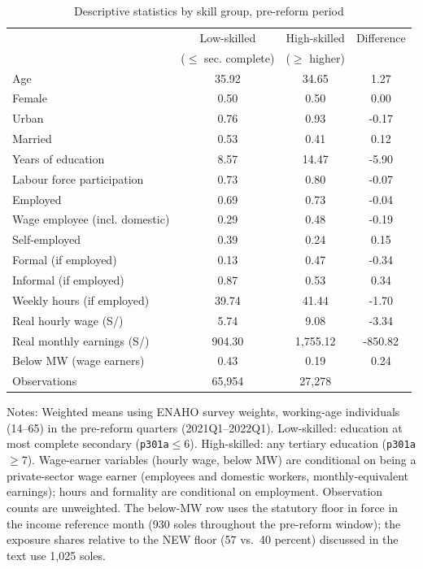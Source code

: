 \begin{table}[!tbp]\centering
\caption{Descriptive statistics by skill group, pre-reform period}\label{tab:desc}
\begin{threeparttable}
\begin{tabular}{lccc}
\toprule
 & Low-skilled & High-skilled & Difference \\
 & ($\le$ sec. complete) & ($\ge$ higher) & \\
\midrule
Age & 35.92 & 34.65 & 1.27 \\
Female & 0.50 & 0.50 & 0.00 \\
Urban & 0.76 & 0.93 & -0.17 \\
Married & 0.53 & 0.41 & 0.12 \\
Years of education & 8.57 & 14.47 & -5.90 \\
Labour force participation & 0.73 & 0.80 & -0.07 \\
Employed & 0.69 & 0.73 & -0.04 \\
Wage employee (incl. domestic) & 0.29 & 0.48 & -0.19 \\
Self-employed & 0.39 & 0.24 & 0.15 \\
Formal (if employed) & 0.13 & 0.47 & -0.34 \\
Informal (if employed) & 0.87 & 0.53 & 0.34 \\
Weekly hours (if employed) & 39.74 & 41.44 & -1.70 \\
Real hourly wage (S/) & 5.74 & 9.08 & -3.34 \\
Real monthly earnings (S/) & 904.30 & 1,755.12 & -850.82 \\
Below MW (wage earners) & 0.43 & 0.19 & 0.24 \\
\midrule
Observations & 65,954 & 27,278 & \\
\bottomrule
\end{tabular}
\begin{tablenotes}\footnotesize
\item Notes: Weighted means using ENAHO survey weights, working-age individuals (14--65) in the pre-reform quarters (2021Q1--2022Q1). Low-skilled: education at most complete secondary (\texttt{p301a}$\le$6). High-skilled: any tertiary education (\texttt{p301a}$\ge$7). Wage-earner variables (hourly wage, below MW) are conditional on being a private-sector wage earner (employees and domestic workers, monthly-equivalent earnings); hours and formality are conditional on employment. Observation counts are unweighted. The below-MW row uses the statutory floor in force in the income reference month (930 soles throughout the pre-reform window); the exposure shares relative to the NEW floor (57 vs.\ 40 percent) discussed in the text use 1{,}025 soles.
\end{tablenotes}
\end{threeparttable}\end{table}
